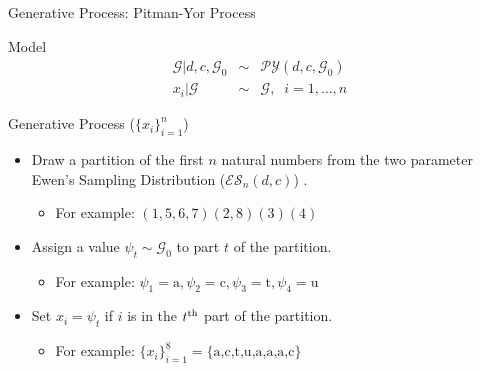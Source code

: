 \documentclass{beamer}
\newcommand{\G}{\mathcal{G}}
\newcommand{\PY}{\mathcal{P}\mathcal{Y}}
\newcommand{\ES}{\mathcal{E}\mathcal{S}}
\begin{document}
\begin{frame}[t]{Generative Process: Pitman-Yor Process}

	\begin{block}{Model}
		\vspace{-.5cm}
		\begin{eqnarray*}
			\G | d,c, \G_0 &\sim& \PY(d,c,\G_0) \\
			x_i | \G &\sim& \G, \;\; i=1,\ldots,n
		\end{eqnarray*}
	\end{block}

	\begin{block}{Generative Process ($\{ x_i \}_{i = 1}^n$)}
		\begin{itemize}
			\item Draw a partition of the first $n$ natural numbers from the two parameter Ewen's Sampling Distribution ($\ES_n(d,c)$) \cite{Ewens1995}.
				\begin{itemize}
					\item For example: $(1,5,6,7)(2,8)(3)(4)$
				\end{itemize}
			\item Assign a value $\psi_t \sim \G_0$ to part $t$ of the partition.
				\begin{itemize}
					\item For example: $\psi_1 = \textrm{a}, \psi_2 = \textrm{c}, \psi_3 = \textrm{t}, \psi_4 = \textrm{u}$
				\end{itemize}			
			\item Set $x_i = \psi_t$ if $i$ is in the $t^{\rm th}$ part of the partition.
				\begin{itemize}
					\item For example: $ \{ x_i \}_{i = 1}^8 = \{ \textrm{a,c,t,u,a,a,a,c} \}$
				\end{itemize}
		\end{itemize}
	\end{block}	
\end{frame}
\end{document}
